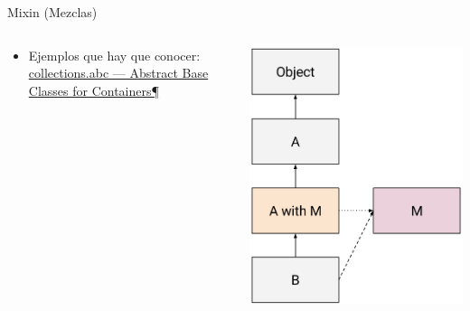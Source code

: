 \documentclass[10pt, envcountsect , spanish]{beamer}
\begin{document}
\begin{frame}{Mixin (Mezclas)}
\begin{columns}
\begin{column}{.78\textwidth}
\begin{itemize}
\item Ejemplos que hay que conocer: \href{https://docs.python.org/3/library/collections.abc.html}{collections.abc — Abstract Base Classes for Containers¶}

\end{itemize}
\end{column}

\begin{column}{.2\textwidth}
\centerline{\includegraphics[width=\textwidth]{fig/class-hierarchy-2}}
\end{column}

\end{columns}
\end{frame}
\end{document}

